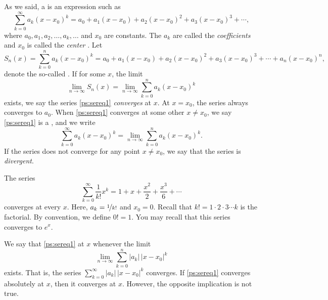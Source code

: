 As we said, a \emph{} is an expression such as
\begin{equation} \label{ps:sereq1}
\sum_{k=0}^\infty a_k {(x-x_0)}^k =
a_0 + 
a_1 (x-x_0) +
a_2 {(x-x_0)}^2 +
a_3 {(x-x_0)}^3 + \cdots,
\end{equation}
where $a_0,a_1,a_2,\ldots,a_k,\ldots$ and $x_0$ are constants.
The $a_k$ are called the \emph{coefficients}%
%
 and $x_0$ is called
the \emph{center}%
.
Let
\begin{equation*}
S_n(x)
=
\sum_{k=0}^n a_k {(x-x_0)}^k
=
a_0 + a_1 (x-x_0) + a_2 {(x-x_0)}^2 + a_3 {(x-x_0)}^3 + \cdots + a_n {(x-x_0)}^n ,
\end{equation*}
denote the so-called \emph{}.  If for some $x$,
the limit
\begin{equation*}
\lim_{n\to \infty} S_n(x) = \lim_{n\to\infty} \sum_{k=0}^n a_k {(x-x_0)}^k
\end{equation*}
exists, we say the series \eqref{ps:sereq1}
\emph{converges} at $x$.
At $x=x_0$, the series always converges to $a_0$.
When \eqref{ps:sereq1}
converges at some other $x \neq x_0$,
we say \eqref{ps:sereq1} is a
\emph{}, and we write
\begin{equation*}
\sum_{k=0}^\infty a_k {(x-x_0)}^k = 
\lim_{n\to\infty} \sum_{k=0}^n a_k {(x-x_0)}^k.
\end{equation*}
If the series does not converge for any point $x \neq x_0$, we say that
the series is \emph{divergent}.

\begin{example} \label{ps:expex}
The series
\begin{equation*}
\sum_{k=0}^\infty \frac{1}{k!} x^k = 
1 + x + \frac{x^2}{2} + \frac{x^3}{6} + \cdots
\end{equation*}
converges at every $x$.
Here, $a_k = \nicefrac{1}{k!}$ and $x_0 = 0$.
Recall that $k! = 1\cdot 2\cdot 3 \cdots k$ is the
factorial.  By convention, we define $0! = 1$.
You may recall that this series
converges to $e^x$.
\end{example}

We say that \eqref{ps:sereq1}
\emph{}
at $x$ whenever the limit
\begin{equation*}
\lim_{n\to\infty} \sum_{k=0}^n
\lvert a_k \rvert \, {\lvert x-x_0 \rvert}^k 
\end{equation*}
exists.  That is, the series
$\sum_{k=0}^\infty \lvert a_k \rvert \, {\lvert x-x_0 \rvert}^k$
converges.
If \eqref{ps:sereq1} converges absolutely at $x$, then it
converges at $x$.  However, the opposite implication is not true.

